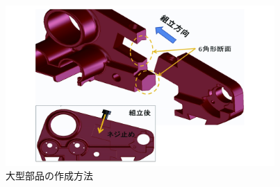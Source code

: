\begin{figure}[htbp]
\centering
\includegraphics[width=290pt]{fig/fig21_cmyk.jpg}
\caption{大型部品の作成方法}
\label{fig21}
\end{figure}

